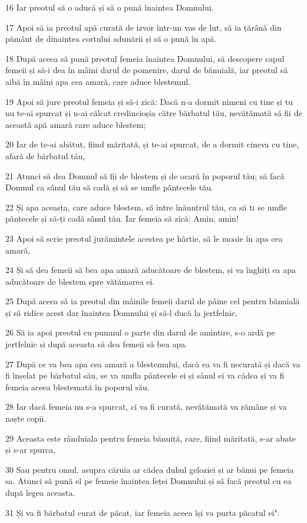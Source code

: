 \par 16 Iar preotul să o aducă și să o pună înaintea Domnului.
\par 17 Apoi să ia preotul apă curată de izvor într-un vas de lut, să ia țărână din pământ de dinaintea cortului adunării și să o pună în apă.
\par 18 După aceea să pună preotul femeia înaintea Domnului, să descopere capul femeii și să-i dea în mâini darul de pomenire, darul de bănuială, iar preotul să aibă în mâini apa cea amară, care aduce blestemul.
\par 19 Apoi să jure preotul femeia și să-i zică: Dacă n-a dormit nimeni cu tine și tu nu te-ai spurcat și n-ai călcat credincioșia către bărbatul tău, nevătămată să fii de această apă amară care aduce blestem;
\par 20 Iar de te-ai abătut, fiind măritată, și te-ai spurcat, de a dormit cineva cu tine, afară de bărbatul tău,
\par 21 Atunci să dea Domnul să fii de blestem și de ocară în poporul tău; să facă Domnul ca sânul tău să cadă și să se umfle pântecele tău.
\par 22 Și apa aceasta, care aduce blestem, să intre înăuntrul tău, ca să ti se umfle pântecele și să-ți cadă sânul tău. Iar femeia să zică: Amin, amin!
\par 23 Apoi să scrie preotul jurămintele acestea pe hârtie, să le moaie în apa cea amară,
\par 24 Și să dea femeii să bea apa amară aducătoare de blestem, și va înghiți ea apa aducătoare de blestem spre vătămarea ei.
\par 25 După aceea să ia preotul din mâinile femeii darul de pâine cel pentru bănuială și să ridice acest dar înaintea Domnului și să-l ducă la jertfelnic.
\par 26 Să ia apoi preotul cu pumnul o parte din darul de amintire, s-o ardă pe jertfelnic și după aceasta să dea femeii să bea apa.
\par 27 După ce va bea apa cea amară a blestemului, dacă ea va fi necurată și dacă va fi înșelat pe bărbatul său, se va umfla pântecele ei și sânul ei va cădea și va fi femeia aceea blestemată în poporul său.
\par 28 Iar dacă femeia nu s-a spurcat, ci va fi curată, nevătămată va rămâne și va naște copii.
\par 29 Aceasta este rânduiala pentru femeia bănuită, care, fiind măritată, s-ar abate și s-ar spurca,
\par 30 Sau pentru omul, asupra căruia ar cădea duhul geloziei și ar bănui pe femeia sa. Atunci să pună el pe femeie înaintea feței Domnului și să facă preotul cu ea după legea aceasta.
\par 31 Și va fi bărbatul curat de păcat, iar femeia aceea își va purta păcatul ei".

